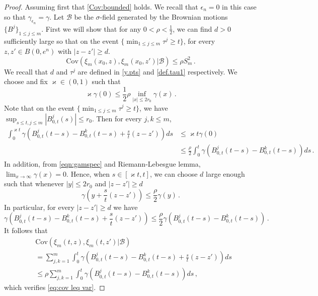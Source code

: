 \documentclass[12pt,reqno]{amsart}
\theoremstyle{remark}
\newcommand{\1}{\mathbf{1}}
\begin{document}
		\begin{proof}
		Assuming first that \ref{Cov:bounded} holds.	
		We recall that $\epsilon_n=0$ in this case so that $\gamma_{\epsilon_n}=\gamma$.
			Let $\mathcal{B}$ be the $\sigma$-field generated by the Brownian motions $\{B^j\}_{1\leq j \leq m}$. First we will show that for any $0 < \rho < \frac12$, we can find $d>0$ sufficiently large so that on the event $\{\min_{1\le j\le m}\tau^j\ge t\}$, for every $z,z'\in B(0,e^n)$ with $|z -z'|\ge d$. 
			\begin{equation}\label{eq:cov leq var}
			\text{Cov} \left( \xi_m(x_0,z), \xi_m(x_0,z') \Big|\mathcal{B}\right) \leq \rho S_m^2\,.
			\end{equation}
			We recall that $d$ and $\tau^j$ are defined in \eqref{y.pts} and \eqref{def.tau1} respectively. 
			We choose and fix $\varkappa\in(0,1)$ such that 
			\begin{equation}
				\varkappa \gamma(0) \leq \frac{1}{2}\rho\inf_{|x|\le 2 r_0}\gamma(x) \,.
			\end{equation}
			Note that on the event $\{\min_{1\le j\le m}\tau^j\ge t\}$, we have $\sup_{s\le t,j\le m}|B^j_{0,t}(s)|\le r_0$.
			Then for every $j,k\le m$, 
			\begin{align*}
				\int_0^{\varkappa t}\gamma\left(B_{0,t}^j(t-s) - B_{0,t}^k(t-s)+ \frac{s}{t} (z-z')\right) ds 
				&\le \varkappa t \gamma(0)
				\\&\le \frac \rho2\int_0^t\gamma\left(B_{0,t}^j(t-s) - B_{0,t}^k(t-s)\right) ds \,.
			\end{align*}
			In addition, from \eqref{eqn:gamspec} and Riemann-Lebesgue lemma, $\lim_{x\to\infty} \gamma(x)=0$. Hence, when $s\in [\varkappa t , t]$, we can choose $d$ large enough such that whenever $|y|\le 2r_0$ and $|z-z'|\ge d$
			\begin{equation*}
				\gamma(y+\frac st (z-z') )\le \frac \rho2 \gamma(y)	\,.
			\end{equation*} 
			In particular, for every $|z-z'|\ge d$ we have
			\begin{equation}
			\gamma\left(B_{0,t}^j(t-s) - B_{0,t}^k(t-s)+ \frac{s}{t} (z-z')\right) \leq \frac{\rho}{2} \gamma\left(B_{0,t}^j(t-s) - B_{0,t}^k(t-s)\right)\,.
			\end{equation}
			It follows that
			\begin{align*}
				&\text{Cov}\left( \xi_m(t,z), \xi_m(t,z') \Big| \mathcal B\right)\\
				&=\sum_{j, k=1}^m \int_0^t \gamma\left( B_{0,t}^j(t-s) -  B_{0,t}^k(t-s) + \frac{s}{t} (z-z')\right) ds
				\\&\le \rho \sum_{j, k=1}^m \int_0^t \gamma\left( B_{0,t}^j(t-s) -  B_{0,t}^k(t-s) \right) ds\,,
			\end{align*}
			which verifies \eqref{eq:cov leq var}.


\end{proof}
\end{document}

